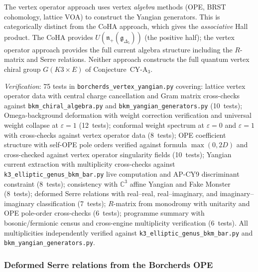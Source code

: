 \begin{warning}
\label{warn:vertex-not-coha}
The vertex operator approach uses vertex \emph{algebra} methods (OPE, BRST cohomology, lattice VOA) to construct the Yangian generators. This is categorically distinct from the CoHA approach, which gives the \emph{associative} Hall product. The CoHA provides $U(\mathfrak{n}_+(\mathfrak{g}_{\Delta_5}))$ (the positive half); the vertex operator approach provides the full current algebra structure including the $R$-matrix and Serre relations. Neither approach constructs the full quantum vertex chiral group $G(K3 \times E)$ of Conjecture~CY-A$_3$.
\end{warning}

\noindent\textit{Verification}: 75 tests in \texttt{borcherds\_vertex\_yangian.py} covering: lattice vertex operator data with central charge cancellation and Gram matrix cross-checks against \texttt{bkm\_chiral\_algebra.py} and \texttt{bkm\_yangian\_generators.py} (10~tests); Omega-background deformation with weight correction verification and universal weight collapse at $\varepsilon = 1$ (12~tests); conformal weight spectrum at $\varepsilon = 0$ and $\varepsilon = 1$ with cross-checks against vertex operator data (8~tests); OPE coefficient structure with self-OPE pole orders verified against formula $\max(0, 2D)$ and cross-checked against vertex operator singularity fields (10~tests); Yangian current extraction with multiplicity cross-checks against \texttt{k3\_elliptic\_genus\_bkm\_bar.py} live computation and AP-CY9 discriminant constraint (8~tests); consistency with $\mathbb{C}^3$ affine Yangian and Fake Monster (8~tests); deformed Serre relations with real--real, real--imaginary, and imaginary--imaginary classification (7~tests); $R$-matrix from monodromy with unitarity and OPE pole-order cross-checks (6~tests); programme summary with bosonic/fermionic census and cross-engine multiplicity verification (6~tests). All multiplicities independently verified against \texttt{k3\_elliptic\_genus\_bkm\_bar.py} and \texttt{bkm\_yangian\_generators.py}.


\subsubsection{Deformed Serre relations from the Borcherds OPE}
\label{subsubsec:k3e-deformed-serre-ope}

